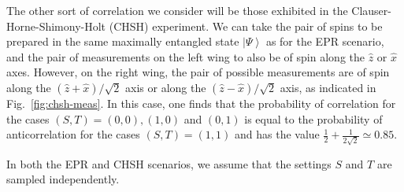 \documentclass[12pt,onecolumn,nofootinbib]{revtex4-2}
\begin{document}
The other sort of correlation we consider will be those exhibited in the Clauser-Horne-Shimony-Holt (CHSH) experiment. We can take the pair of spins to be prepared in the same maximally entangled state $%
\left\vert \Psi \right\rangle $ as for the EPR scenario, and the pair of
measurements on the left wing to also be of spin along the $\hat{z}$ or $%
\hat{x}$ axes. However, on the right wing, the pair of possible
measurements are of spin along the $(\hat{z}+\hat{x})/\sqrt{2}$ axis or along the $(\hat{
z}-\hat{x})/\sqrt{2}$ axis, as indicated in Fig.~\ref{fig:chsh-meas}. In this case, one finds that the probability of correlation for the cases $\left(
S,T\right) =(0,0),(1,0)$ and $(0,1)$ is equal to the probability of
anticorrelation for the cases $\left( S,T\right) =(1,1)$ and has the value $%
\frac{1}{2}+\frac{1}{2\sqrt{2}}\simeq 0.85.$

In both the EPR and CHSH scenarios, we assume that the settings $S$ and $T$ are sampled independently.
\end{document}
